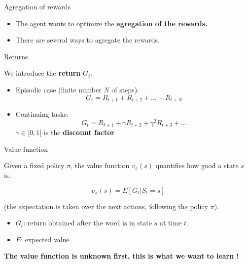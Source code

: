 \documentclass[usenames,dvipsnames]{beamer}
\begin{document}
\begin{frame}{Agregation of rewards}
   \begin{itemize}
       \item The agent wants to optimize the \textbf{{agregation of the rewards.}} 
	\item There are several ways to agregate the rewards.
   \end{itemize} 
\end{frame}

\begin{frame}{Returns}

    We introduce the \textbf{return} $G_t$.

    \begin{itemize}
	\item Episodic case (finite number $N$ of steps):
	    \begin{equation}
		G_t = R_{t+1} + R_{t+2} + \dots + R_{t+N}
	    \end{equation}
	\item Continuing tasks:
	    \begin{equation}
		G_t = R_{t+1} + \gamma R_{t+2} + \gamma^2 R_{t+3} + \dots 
	    \end{equation}
	    $\gamma \in [0,1[$ is the \textbf{{discount factor}}
    \end{itemize}

\end{frame}

\begin{frame}{Value function}

    Given a fixed policy $\pi$, the value function $v_{\pi}(s)$ quantifies how good a state $s$ is.

    \begin{equation}
	v_{\pi}(s) = E[G_t|S_t=s]
    \end{equation}

    (the expectation is taken over the next actions, following the policy $\pi$).

    \begin{itemize}
        \item $G_t$: return obtained after the word is in state $s$ at time $t$.
	\item $E$: expected value
    \end{itemize}

    \textbf{The value function is unknown first, this is what we want to learn !}

\end{frame}
\end{document}
